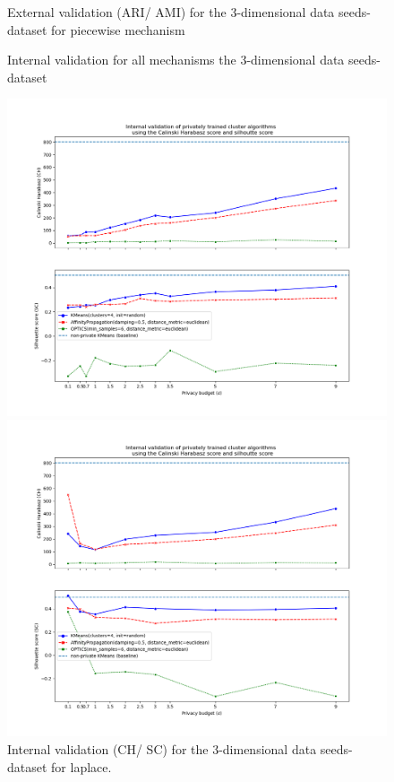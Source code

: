 {\begin{figure}[H]
\begin{minipage}[c]{0.49\textwidth}
            \caption{External validation (ARI/ AMI) for the 3-dimensional data seeds-dataset for piecewise mechanism}
            \label{fig:appendix-external-validation-seeds-dataset_comparison_3d-piecewise}
        \end{minipage}
    \end{figure}
}

\begin{figure}[H]
    \caption{Internal validation for all mechanisms the 3-dimensional data seeds-dataset}
    \centering
    \begin{minipage}[c]{0.49\textwidth}
        \includegraphics[width=1\textwidth]{Results/3d-laplace/seeds-dataset/ch-and-sc.png}
        \caption{Internal validation (CH/ SC) for the 3-dimensional data seeds-dataset for laplace.}
        \label{fig:appendix-internal-validation-seeds-dataset_comparison_3d-laplace}
    \end{minipage}
    \begin{minipage}[c]{0.49\textwidth}
        \includegraphics[width=1\textwidth]{Results/3d-laplace-truncated/seeds-dataset/ch-and-sc.png}

\end{minipage}
\end{figure}

